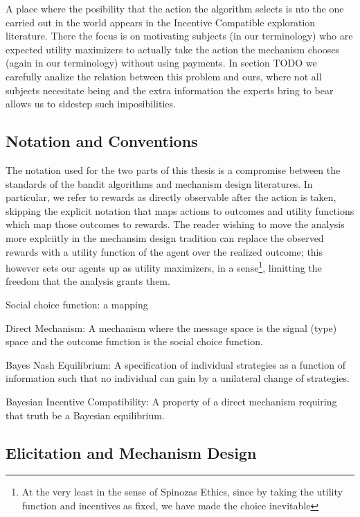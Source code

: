 A place where the posibility that the action the algorithm selects is nto the one carried out in the world appears in the Incentive Compatible exploration literature. There the focus is on motivating subjects (in our terminology) who are expected utility maximizers to actually take the action the mechanism chooses (again in our terminology) without using payments. In section TODO we carefully analize the relation between this problem and ours, where not all subjects necesitate being and the extra information the experts bring to bear allows us to sidestep such imposibilities.



\subsection{Notation and Conventions}

The notation used for the two parts of this thesis is a compromise between the standards of the bandit algorithms and mechanism design literatures. In particular, we refer to rewards as directly observable after the action is taken, skipping the explicit notation that maps actions to outcomes and utility functions which map those outcomes to rewards. The reader wishing to move the analysis more explciitly in the mechansim design tradition can replace the observed rewards with a utility function of the agent over the realized outcome; this however sets our agents up as utility maximizers, in a sense\footnote{At the very least in the sense of Spinozas Ethics, since by taking the utility function and incentives as fixed, we have made the choice inevitable}, limitting the freedom that the analysis grants them.

Social choice function: a mapping 

Direct Mechanism: A mechanism where the message space is the signal (type) space and
the outcome function is the social choice function.

Bayes Nash Equilibrium: A specification of individual strategies as a function of information
such that no individual can gain by a unilateral change of strategies.


Bayesian Incentive Compatibility: A property of a direct mechanism requiring
that truth be a Bayesian equilibrium.



\subsection{Elicitation and Mechanism Design}



